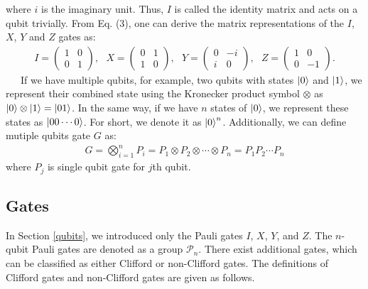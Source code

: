 \documentclass[a4paper,11pt]{ltjsarticle}
\begin{document}
{{        where $i$ is the imaginary unit. Thus, $I$ is called the identity matrix and acts on a qubit trivially. From Eq. (3), one can derive the matrix representations of the $I$, $X$, $Y$ and $Z$ gates as:
        \begin{align}
            I=\left(\begin{array}{cc}
                1&0\\
                0&1
            \end{array}\right),\ \ \ 
            X=\left(\begin{array}{cc}
                0&1\\
                1&0
            \end{array}\right),\ \ \ 
            Y=\left(\begin{array}{cc}
                0&-i\\
                i&0
            \end{array}\right),\ \ \ 
            Z=\left(\begin{array}{cc}
                1&0\\
                0&-1
            \end{array}\right).
        \end{align}
        \ \ \ If we have multiple qubits, for example, two qubits with states $\ket{0}$ and $\ket{1}$, we represent their combined state using the Kronecker product symbol $\otimes$ as $\ket{0} \otimes \ket{1} = \ket{01}$. In the same way, if we have $n$ states of $\ket{0}$, we represent these states as $\ket{00\cdots 0}$. For short, we denote it as $\ket{0}^n$. Additionally, we can define mutiple qubits gate $G$ as:
        \begin{align}
            G = \bigotimes^n_{i=1}{P_i}=P_1\otimes P_2\otimes\cdots \otimes P_n=P_1P_2\cdots P_n
        \end{align}
        where $P_j$ is single qubit gate for $j$th qubit.
    }
    \subsection{Gates}\label{gates}{
        In Section \ref{qubits}, we introduced only the Pauli gates $I$, $X$, $Y$, and $Z$. The $n$-qubit Pauli gates are denoted as a group $\mathcal{P}_n$. There exist additional gates, which can be classified as either Clifford or non-Clifford gates. The definitions of Clifford gates and non-Clifford gates are given as follows.

}}
\end{document}
